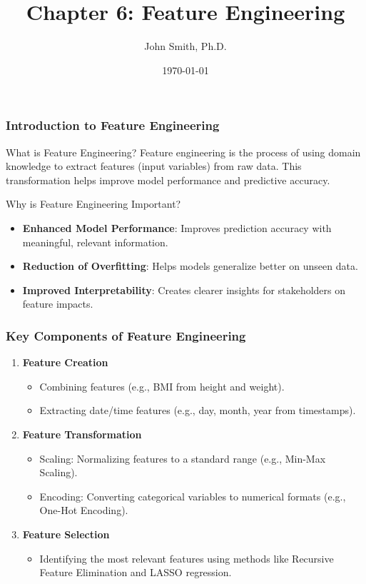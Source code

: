 \documentclass[aspectratio=169]{beamer}
\title[Feature Engineering]{Chapter 6: Feature Engineering}
\author[J. Smith]{John Smith, Ph.D.}
\date{\today}
\begin{document}
\frame{\titlepage}

\begin{frame}[fragile]
    \frametitle{Introduction to Feature Engineering}
    \begin{block}{What is Feature Engineering?}
        Feature engineering is the process of using domain knowledge to extract features (input variables) from raw data. This transformation helps improve model performance and predictive accuracy.
    \end{block}

    \begin{block}{Why is Feature Engineering Important?}
        \begin{itemize}
            \item \textbf{Enhanced Model Performance}: Improves prediction accuracy with meaningful, relevant information.
            \item \textbf{Reduction of Overfitting}: Helps models generalize better on unseen data.
            \item \textbf{Improved Interpretability}: Creates clearer insights for stakeholders on feature impacts.
        \end{itemize}
    \end{block}
\end{frame}

\begin{frame}[fragile]
    \frametitle{Key Components of Feature Engineering}
    \begin{enumerate}
        \item \textbf{Feature Creation}
            \begin{itemize}
                \item Combining features (e.g., BMI from height and weight).
                \item Extracting date/time features (e.g., day, month, year from timestamps).
            \end{itemize}
        \item \textbf{Feature Transformation}
            \begin{itemize}
                \item Scaling: Normalizing features to a standard range (e.g., Min-Max Scaling).
                \item Encoding: Converting categorical variables to numerical formats (e.g., One-Hot Encoding).
            \end{itemize}
        \item \textbf{Feature Selection}
            \begin{itemize}
                \item Identifying the most relevant features using methods like Recursive Feature Elimination and LASSO regression.
            \end{itemize}
    \end{enumerate}
\end{frame}
\end{document}
